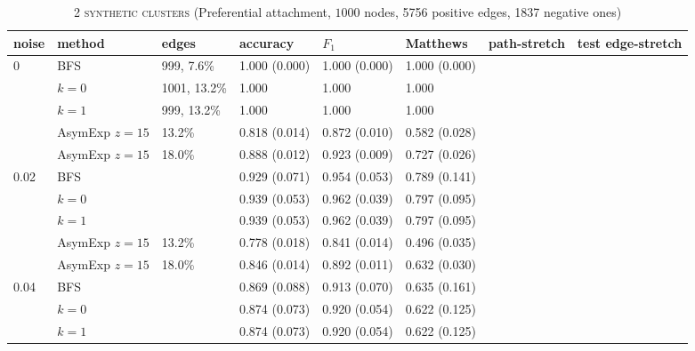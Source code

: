 \documentclass[a4paper,final,notitlepage,11pt,svgnames]{scrartcl}
\begin{document}
\begin{table}[htpb]
	\centering
	\vspace*{-2em}
	\caption{\textsc{2 synthetic clusters} (Preferential attachment, $1000$ nodes, 5756 positive edges, 1837 negative ones) \label{tab:synthpa}}
	\begin{tabular}{llllllll}
		\toprule
		noise                 & method         & edges        & accuracy      & $F_1$         & Matthews      & path-stretch & test edge-stretch \\
		\midrule
		\multirow{5}{*}{0}    & BFS            & 999, 7.6\%   & 1.000 (0.000) & 1.000 (0.000) & 1.000 (0.000) &              & \\
		                      & $k=0$          & 1001, 13.2\% & 1.000         & 1.000         & 1.000         &              & \\
		                      & $k=1$          & 999, 13.2\%  & 1.000         & 1.000         & 1.000         &              & \\
		                      & AsymExp $z=15$ & 13.2\%       & 0.818 (0.014) & 0.872 (0.010) & 0.582 (0.028) &              & \\
		                      & AsymExp $z=15$ & 18.0\%       & 0.888 (0.012) & 0.923 (0.009) & 0.727 (0.026) &              & \\
		\midrule
		\multirow{5}{*}{0.02} & BFS            &              & 0.929 (0.071) & 0.954 (0.053) & 0.789 (0.141) &              & \\
		                      & $k=0$          &              & 0.939 (0.053) & 0.962 (0.039) & 0.797 (0.095) &              & \\
		                      & $k=1$          &              & 0.939 (0.053) & 0.962 (0.039) & 0.797 (0.095) &              & \\
		                      & AsymExp $z=15$ & 13.2\%       & 0.778 (0.018) & 0.841 (0.014) & 0.496 (0.035) &              & \\
		                      & AsymExp $z=15$ & 18.0\%       & 0.846 (0.014) & 0.892 (0.011) & 0.632 (0.030) &              & \\
		\cmidrule(r){2-6}
		\multirow{5}{*}{0.04} & BFS            &              & 0.869 (0.088) & 0.913 (0.070) & 0.635 (0.161) &              & \\
		                      & $k=0$          &              & 0.874 (0.073) & 0.920 (0.054) & 0.622 (0.125) &              & \\
		                      & $k=1$          &              & 0.874 (0.073) & 0.920 (0.054) & 0.622 (0.125) &              & \\

\end{tabular}
\end{table}
\end{document}
